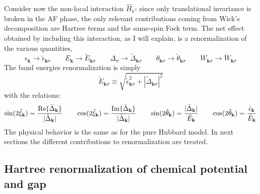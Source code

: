 Consider now the non-local interaction $\hat H_V$: since only translational invariance is broken in the AF phase, the only relevant contributions coming from Wick's decomposition are Hartree terms and the same-spin Fock term. The net effect obtained by including this interaction, as I will explain, is a renormalization of the various quantities,
\[
	\epsilon_\mathbf{k} \to \tilde{\epsilon}_{\mathbf{k}\sigma}
	\qquad
	E_\mathbf{k} \to \tilde{E}_{\mathbf{k}\sigma}
	\qquad
	\Delta_\sigma \to \tilde{\Delta}_{\mathbf{k}\sigma}
	\qquad
	\theta_{\mathbf{k}\sigma} \to \tilde{\theta}_{\mathbf{k}\sigma}
	\qquad
	W_{\mathbf{k}\sigma} \to \tilde{W}_{\mathbf{k}\sigma}
\]
The band energies renormalization is simply
\[
	\tilde{E}_{\mathbf{k}\sigma} \equiv \sqrt{\tilde{\epsilon}_{\mathbf{k}\sigma}^2 + |\tilde{\Delta}_{\mathbf{k}\sigma}|^2}
\]
with the relations:
\begin{equation}\label{eq:af-bogoliubov-angle-relations}
	\sin \normalfont(2\tilde{\xi}_\mathbf{k}) = \frac{\Re\{\tilde{\Delta}_\mathbf{k}\}}{|\tilde{\Delta}_\mathbf{k}|}
	\qquad
	\cos \normalfont(2\tilde{\xi}_\mathbf{k}) = \frac{\Im\{\tilde{\Delta}_\mathbf{k}\}}{|\tilde{\Delta}_\mathbf{k}|}
	\qquad
	\sin \normalfont(2\tilde{\theta}_\mathbf{k}) = \frac{|\tilde{\Delta}_\mathbf{k}|}{\tilde{E}_\mathbf{k}}
	\qquad
	\cos \normalfont(2\tilde{\theta}_\mathbf{k}) = \frac{\tilde{\epsilon}_\mathbf{k}}{\tilde{E}_\mathbf{k}}
\end{equation}
The physical behavior is the same as for the pure Hubbard model. In next sections the different contributions to renormalization are treated.

\subsection{Hartree renormalization of chemical potential and gap}

